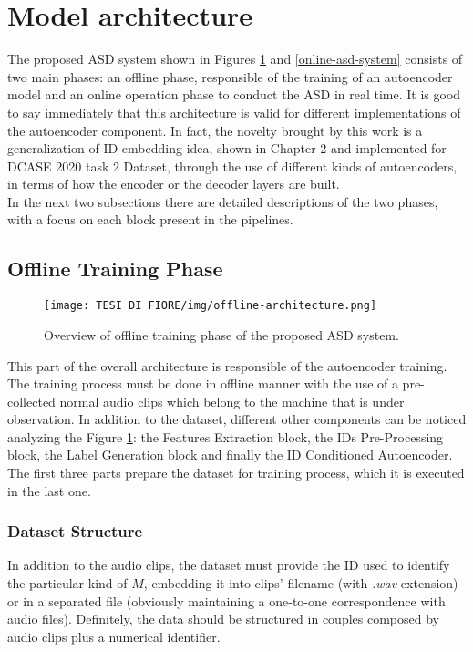 \section{Model architecture}
The proposed ASD system shown in Figures \ref{offline-asd-system} and \ref{online-asd-system} consists of two main phases: an offline phase, responsible of the training of an autoencoder model and an online operation phase to conduct the ASD in real time. It is good to say immediately that this architecture is valid for different implementations of the autoencoder component. In fact, the novelty brought by this work is a generalization of ID embedding idea, shown in Chapter 2 and implemented for DCASE 2020 task 2 Dataset, through the use of different kinds of autoencoders, in terms of how the encoder or the decoder layers are built.\\
In the next two subsections there are detailed descriptions of the two phases, with a focus on each block present in the pipelines.
\subsection{Offline Training Phase}
\begin{figure}[ht]
\texttt{[image: TESI DI FIORE/img/offline-architecture.png]}
\centering
\caption{Overview of offline training phase of the proposed ASD system.}
\label{offline-asd-system}
\end{figure}
This part of the overall architecture is responsible of the autoencoder training. The training process must be done in offline manner with the use of a pre-collected normal audio clips which belong to the machine that is under observation. In addition to the dataset, different other components can be noticed analyzing the Figure \ref{offline-asd-system}: the Features Extraction block, the IDs Pre-Processing block, the Label Generation block and finally the ID Conditioned Autoencoder. The first three parts prepare the dataset for training process, which it is executed in the last one.
\subsubsection{Dataset Structure}
In addition to the audio clips, the dataset must provide the ID used to identify the particular kind of $M$, embedding it into clips' filename (with \textit{.wav} extension) or in a separated file (obviously maintaining a one-to-one correspondence with audio files). Definitely, the data should be structured in couples composed by audio clips plus a numerical identifier.
